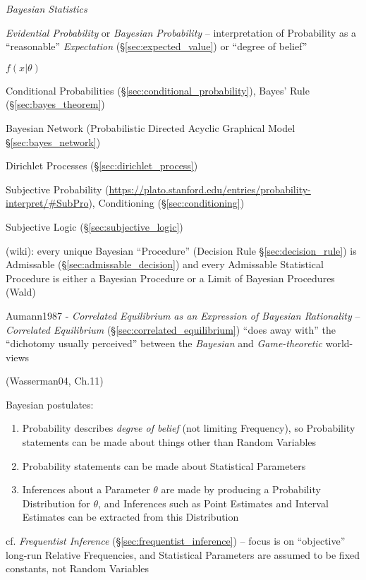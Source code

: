 \emph{Bayesian Statistics}

\emph{Evidential Probability} or \emph{Bayesian Probability} -- interpretation
of Probability as a ``reasonable'' \emph{Expectation}
(\S\ref{sec:expected_value}) or ``degree of belief''

$f(x | \theta)$

Conditional Probabilities (\S\ref{sec:conditional_probability}), Bayes' Rule
(\S\ref{sec:bayes_theorem})

\fist Bayesian Network (Probabilistic Directed Acyclic Graphical Model
\S\ref{sec:bayes_network})

\fist Dirichlet Processes (\S\ref{sec:dirichlet_process})

Subjective Probability %
(\url{https://plato.stanford.edu/entries/probability-interpret/#SubPro}),
Conditioning (\S\ref{sec:conditioning})

\fist Subjective Logic (\S\ref{sec:subjective_logic})

(wiki): every unique Bayesian ``Procedure'' (Decision Rule
\S\ref{sec:decision_rule}) is Admissable (\S\ref{sec:admissable_decision}) and
every Admissable Statistical Procedure is either a Bayesian Procedure or a Limit
of Bayesian Procedures (Wald)

\fist Aumann1987 - \emph{Correlated Equilibrium as an Expression of Bayesian
  Rationality} -- \emph{Correlated Equilibrium}
(\S\ref{sec:correlated_equilibrium}) ``does away with'' the ``dichotomy usually
perceived'' between the \emph{Bayesian} and \emph{Game-theoretic} world-views

(Wasserman04, Ch.11)

Bayesian postulates:
\begin{enumerate}
  \item Probability describes \emph{degree of belief} (not limiting Frequency),
    so Probability statements can be made about things other than Random
    Variables
  \item Probability statements can be made about Statistical Parameters
  \item Inferences about a Parameter $\theta$ are made by producing a
    Probability Distribution for $\theta$, and Inferences such as Point
    Estimates and Interval Estimates can be extracted from this Distribution
\end{enumerate}

cf. \emph{Frequentist Inference} (\S\ref{sec:frequentist_inference}) -- focus is
on ``objective'' long-run Relative Frequencies, and Statistical Parameters are
assumed to be fixed constants, not Random Variables


